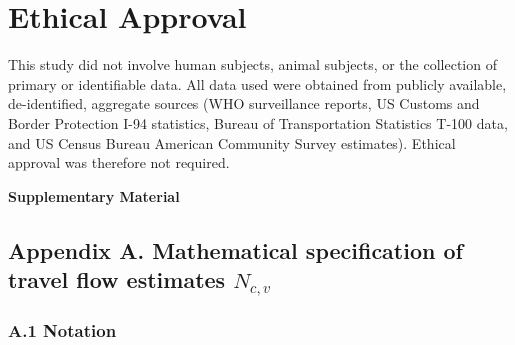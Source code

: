 \documentclass[12pt, a4paper]{article}
\newcounter{suppfig}
\begin{document}
\section*{Ethical Approval}
This study did not involve human subjects, animal subjects, or the collection of primary or identifiable data. All data used were obtained from publicly available, de-identified, aggregate sources (WHO surveillance reports, US Customs and Border Protection I-94 statistics, Bureau of Transportation Statistics T-100 data, and US Census Bureau American Community Survey estimates). Ethical approval was therefore not required.




\newpage

\begin{center}
{\large\bfseries Supplementary Material}
\end{center}

\setcounter{suppfig}{0}

\subsection*{Appendix A. Mathematical specification of travel flow
estimates $N_{c,v}$}

\subsubsection*{A.1 Notation}
\end{document}

